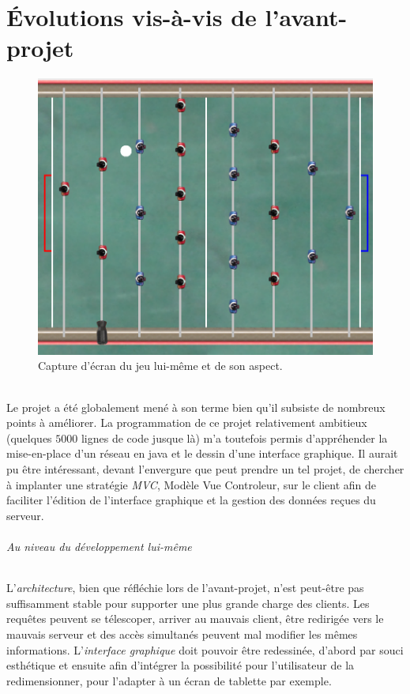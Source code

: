 \documentclass[a4paper,12pt]{report}
\begin{document}
\part{Évolutions vis-à-vis de l'avant-projet}
\begin{figure}[H]
	\begin{center}
	\includegraphics[width=15cm]{pictures/jeu.png} 
	\end{center}
	\caption{Capture d'écran du jeu lui-même et de son aspect.}
    \end{figure}
\paragraph{}
Le projet a été globalement mené à son terme bien qu'il subsiste de nombreux points à améliorer. La programmation de ce projet relativement ambitieux (quelques $5000$ lignes de code jusque là) m'a toutefois permis d'appréhender la mise-en-place d'un réseau en java et le dessin d'une interface graphique. Il aurait pu être intéressant, devant l'envergure que peut prendre un tel projet, de chercher à implanter une stratégie \emph{MVC}, Modèle Vue Controleur, sur le client afin de faciliter l'édition de l'interface graphique et la gestion des données reçues du serveur.
\paragraph{Au niveau du développement lui-même}
L'\emph{architecture}, bien que réfléchie lors de l'avant-projet, n'est peut-être pas suffisamment stable pour supporter une plus grande charge des clients. Les requêtes peuvent se télescoper, arriver au mauvais client, être redirigée vers le mauvais serveur et des accès simultanés peuvent mal modifier les mêmes informations. L'\emph{interface graphique} doit pouvoir être redessinée, d'abord par souci esthétique et ensuite afin d'intégrer la possibilité pour l'utilisateur de la redimensionner, pour l'adapter à un écran de tablette par exemple.
\end{document}
